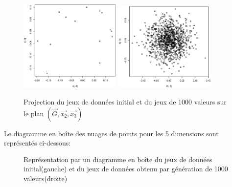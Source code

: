 \documentclass[a4paper]{article}
\begin{document}
\begin{figure}[H]
\includegraphics[width=5cm]{proj23data.eps}\hfill
\includegraphics[width=5cm]{proj23gener.eps}
\caption{Projection du jeux de données initial et du jeux de 1000 valeurs sur le plan $(\vec{G},\vec{x_{2}},\vec{x_{3}})$}\label{fig:somefiglabel}
\end{figure}

\newpage

Le diagramme en boîte des nuages de points pour les 5  dimensions sont  représentés ci-dessous:
\begin{figure}[H]
\hfill
{}
\caption{Représentation par un diagramme en boîte du jeux de données initial(gauche) et du jeux de données obtenu par génération de 1000 valeurs(droite)}\label{fig:somefiglabel}
\end{figure}
\end{document}
